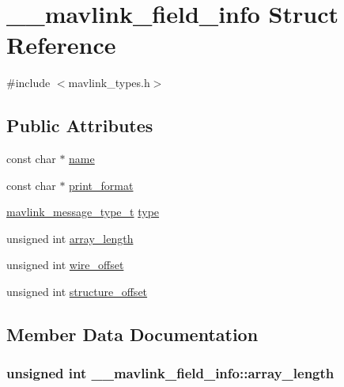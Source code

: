 \hypertarget{struct____mavlink__field__info}{}\section{\+\_\+\+\_\+mavlink\+\_\+field\+\_\+info Struct Reference}
\label{struct____mavlink__field__info}


{\ttfamily \#include $<$mavlink\+\_\+types.\+h$>$}

\subsection*{Public Attributes}
\begin{DoxyCompactItemize}
\item 
const char $\ast$ \hyperlink{struct____mavlink__field__info_a09193c7acc510180ecf6f944381e53c2}{name}
\item 
const char $\ast$ \hyperlink{struct____mavlink__field__info_af3fc635b6e03851bb683c0c3d57dfc12}{print\+\_\+format}
\item 
\hyperlink{mavlink__types_8h_ab6045b7adc25bdc05a5011a91dc645a4}{mavlink\+\_\+message\+\_\+type\+\_\+t} \hyperlink{struct____mavlink__field__info_a32f98e7c869ae1567c4ad366c74b6552}{type}
\item 
unsigned int \hyperlink{struct____mavlink__field__info_aa3ab268c4176743874c8d05694ed293f}{array\+\_\+length}
\item 
unsigned int \hyperlink{struct____mavlink__field__info_a7156648575e497f112fde78e851dd4d9}{wire\+\_\+offset}
\item 
unsigned int \hyperlink{struct____mavlink__field__info_acb947cd22e51e70e8b5f677b543196ac}{structure\+\_\+offset}
\end{DoxyCompactItemize}


\subsection{Member Data Documentation}
\subsubsection[{\texorpdfstring{array\+\_\+length}{array_length}}]{\setlength{\rightskip}{0pt plus 5cm}unsigned int \+\_\+\+\_\+mavlink\+\_\+field\+\_\+info\+::array\+\_\+length}\hypertarget{struct____mavlink__field__info_aa3ab268c4176743874c8d05694ed293f}{}\label{struct____mavlink__field__info_aa3ab268c4176743874c8d05694ed293f}
